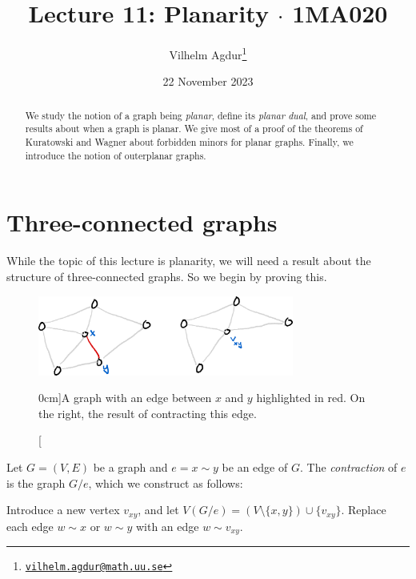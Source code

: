 \documentclass[nobib]{tufte-handout}
\title{Lecture 11: Planarity $\cdot$ 1MA020}
\author[Vilhelm Agdur]{Vilhelm Agdur\thanks{\href{mailto:vilhelm.agdur@math.uu.se}{\nolinkurl{vilhelm.agdur@math.uu.se}}}}
\date{22 November 2023}
\begin{document}
\maketitle%

\begin{abstract}
\noindent
We study the notion of a graph being \emph{planar}, define its \emph{planar dual}, and prove some results about when a graph is planar. We give most of a proof of the theorems of Kuratowski and Wagner about forbidden minors for planar graphs. Finally, we introduce the notion of outerplanar graphs.
\end{abstract}

\section{Three-connected graphs}

While the topic of this lecture is planarity, we will need a result about the structure of three-connected graphs. So we begin by proving this.

\begin{figure}
  \centering
  \includegraphics[width=0.75\textwidth]{graphics/L11_planarity/edge_contraction.png}
  \caption[][0cm]{A graph with an edge between $x$ and $y$ highlighted in red. On the right, the result of contracting this edge.}
  \label{fig:edge_contraction}
\end{figure}

\begin{definition}
  Let $G = (V,E)$ be a graph and $e = x\sim y$ be an edge of $G$. The \emph{contraction} of $e$ is the graph $G/e$, which we construct as follows:

  Introduce a new vertex $v_{xy}$, and let $V(G/e) = (V \setminus \{x,y\}) \cup \{v_{xy}\}$. Replace each edge $w \sim x$ or $w \sim y$ with an edge $w \sim v_{xy}$.
\end{definition}
\end{document}
